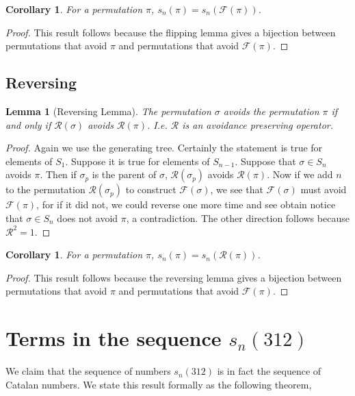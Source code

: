 \documentclass[11pt,letterpaper,twoside,english]{article}
\theoremstyle{theorem}
\newtheorem{corollary}[theorem]{Corollary}
\newtheorem{lemma}[theorem]{Lemma}
\theoremstyle{remark}
\begin{document}
\begin{corollary} 
For a permutation $\pi$, $s_n(\pi)=s_n(\mathcal{F}(\pi))$. 
\end{corollary}
\begin{proof}
This result follows because the flipping lemma gives a bijection between permutations that avoid $\pi$ and permutations that avoid $\mathcal{F}(\pi)$. 
\end{proof}
\subsection{Reversing}

\begin{lemma}[Reversing Lemma]
The permutation $\sigma$ avoids the permutation $\pi$ if and only if $\mathcal{R}(\sigma)$ avoids $\mathcal{R}(\pi)$. I.e. $\mathcal{R}$ is an avoidance preserving operator. 
\end{lemma}
\begin{proof}
Again we use the generating tree. Certainly the statement is true for elements of $S_1$. Suppose it is true for elements of $S_{n-1}$. Suppose that $\sigma\in S_n$ avoids $\pi$. Then if $\sigma_p$ is the parent of $\sigma$, $\mathcal{R}(\sigma_p)$ avoids $\mathcal{R}(\pi)$. Now if we add $n$ to the permutation $\mathcal{R}(\sigma_p)$ to construct $\mathcal{F}(\sigma)$, we see that $\mathcal{F}(\sigma)$ must avoid $\mathcal{F}(\pi)$, for if it did not, we could reverse one more time and see obtain notice that $\sigma\in S_n$ does not avoid $\pi$, a contradiction. The other direction follows because $\mathcal{R}^2=1$. 
\end{proof}

\begin{corollary} 
For a permutation $\pi$, $s_n(\pi)=s_n(\mathcal{R}(\pi))$. 
\end{corollary}
\begin{proof}
This result follows because the reversing lemma gives a bijection between permutations that avoid $\pi$ and permutations that avoid $\mathcal{F}(\pi)$. 
\end{proof}
\section{Terms in the sequence $s_n(312)$}
\label{S3}

We claim that the sequence of numbers $s_n(312)$ is in fact the sequence of Catalan numbers. We state this result formally as the following theorem,
\end{document}
